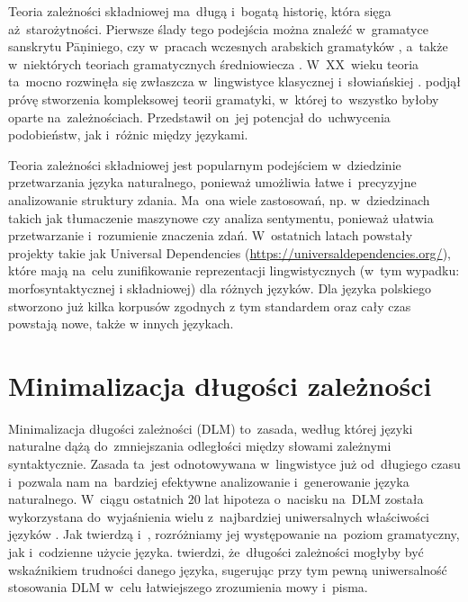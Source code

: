 \documentclass[licencjacka]{pracamgr_Kogni}
\begin{document}
Teoria zależności składniowej ma~długą i~bogatą historię, która sięga aż~starożytności. Pierwsze ślady tego podejścia można znaleźć w~gramatyce sanskrytu Pāṇiniego, czy w~pracach wczesnych arabskich gramatyków \citep{Kruijff2002}, a~także w~niektórych teoriach gramatycznych średniowiecza \citep{Covington1984}. W~XX~wieku teoria ta~mocno rozwinęła się zwłaszcza w~lingwistyce klasycznej i~słowiańskiej \citep{Melcuk1988}. \citet{Tesniere1959} podjął próvę stworzenia kompleksowej teorii gramatyki, w~której to~wszystko byłoby oparte na~zależnościach. Przedstawił on~jej potencjał do~uchwycenia podobieństw, jak i~różnic między językami.

Teoria zależności składniowej jest popularnym podejściem w~dziedzinie przetwarzania języka naturalnego, ponieważ umożliwia łatwe i~precyzyjne analizowanie struktury zdania. Ma~ona wiele zastosowań, np. w~dziedzinach takich jak tłumaczenie maszynowe czy analiza sentymentu, ponieważ ułatwia przetwarzanie i~rozumienie znaczenia zdań. W~ostatnich latach powstały projekty takie jak Universal Dependencies (\url{https://universaldependencies.org/}), które mają na~celu zunifikowanie reprezentacji lingwistycznych (w~tym wypadku: morfosyntaktycznej i składniowej) dla różnych języków. Dla języka polskiego stworzono już kilka korpusów zgodnych z tym standardem \citep{Przepiorkowski2020} %
 oraz cały czas powstają nowe, także w innych językach.

\section{Minimalizacja długości zależności}
Minimalizacja długości zależności (DLM) to~zasada, według której języki naturalne dążą do~zmniejszania odległości między słowami zależnymi syntaktycznie. Zasada ta~jest odnotowywana w~lingwistyce już od~długiego czasu i~pozwala nam na~bardziej efektywne analizowanie i~generowanie języka naturalnego. W~ciągu ostatnich 20 lat hipoteza o~nacisku na~DLM została wykorzystana do~wyjaśnienia wielu z~najbardziej uniwersalnych właściwości języków \citep{FutrellEtAl2015}.
Jak twierdzą \citet{Hawkins1994} i~\citet{FutrellEtAl2020}, rozróżniamy jej występowanie na~poziom gramatyczny, jak i~codzienne użycie języka. \citet{Liu2008} twierdzi, że~długości zależności mogłyby być wskaźnikiem trudności danego języka, sugerując przy tym pewną uniwersalność stosowania DLM w~celu łatwiejszego zrozumienia mowy i~pisma.
\end{document}
